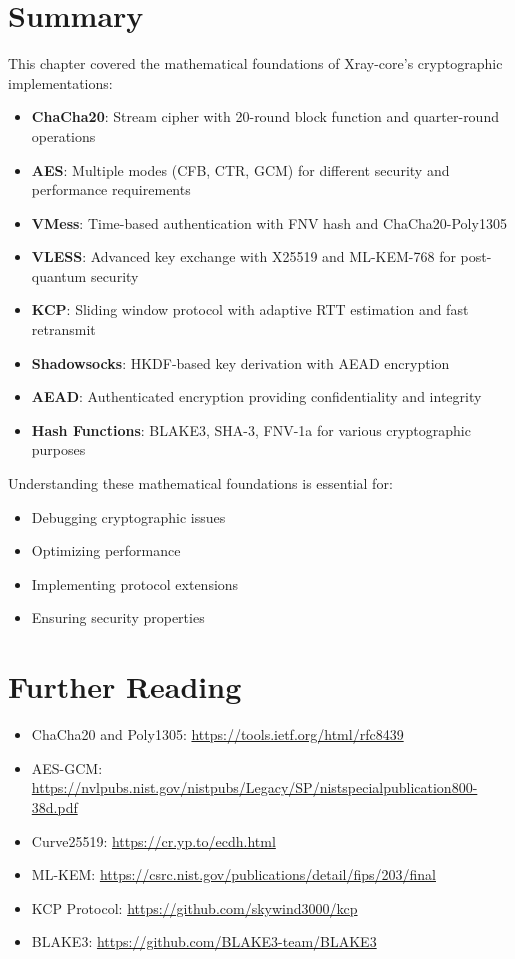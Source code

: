 \section{Summary}

This chapter covered the mathematical foundations of Xray-core's cryptographic implementations:

\begin{itemize}
    \item \textbf{ChaCha20}: Stream cipher with 20-round block function and quarter-round operations
    \item \textbf{AES}: Multiple modes (CFB, CTR, GCM) for different security and performance requirements
    \item \textbf{VMess}: Time-based authentication with FNV hash and ChaCha20-Poly1305
    \item \textbf{VLESS}: Advanced key exchange with X25519 and ML-KEM-768 for post-quantum security
    \item \textbf{KCP}: Sliding window protocol with adaptive RTT estimation and fast retransmit
    \item \textbf{Shadowsocks}: HKDF-based key derivation with AEAD encryption
    \item \textbf{AEAD}: Authenticated encryption providing confidentiality and integrity
    \item \textbf{Hash Functions}: BLAKE3, SHA-3, FNV-1a for various cryptographic purposes
\end{itemize}

Understanding these mathematical foundations is essential for:
\begin{itemize}
    \item Debugging cryptographic issues
    \item Optimizing performance
    \item Implementing protocol extensions
    \item Ensuring security properties
\end{itemize}

\section{Further Reading}

\begin{itemize}
    \item ChaCha20 and Poly1305: \url{https://tools.ietf.org/html/rfc8439}
    \item AES-GCM: \url{https://nvlpubs.nist.gov/nistpubs/Legacy/SP/nistspecialpublication800-38d.pdf}
    \item Curve25519: \url{https://cr.yp.to/ecdh.html}
    \item ML-KEM: \url{https://csrc.nist.gov/publications/detail/fips/203/final}
    \item KCP Protocol: \url{https://github.com/skywind3000/kcp}
    \item BLAKE3: \url{https://github.com/BLAKE3-team/BLAKE3}
\end{itemize}

